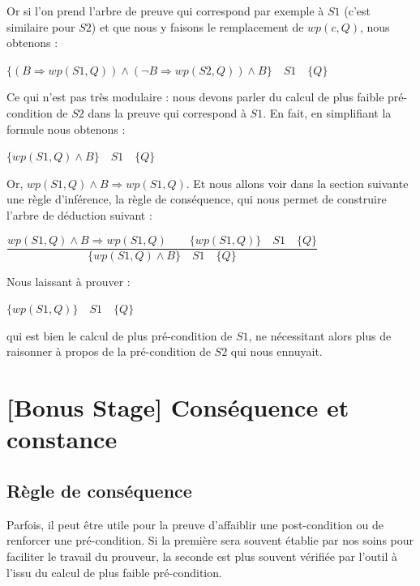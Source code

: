 \documentclass[12pt,francais,]{scrbook}
\begin{document}
Or si l'on prend l'arbre de preuve qui correspond par exemple à \(S1\)
(c'est similaire pour \(S2\)) et que nous y faisons le remplacement de
\(wp(c,Q)\), nous obtenons :

\begin{center}
\(\{ (B \Rightarrow wp(S1,Q)) \wedge (\neg B \Rightarrow wp(S2,Q)) \wedge B \} \quad S1 \quad \{Q\}\)
\end{center}

Ce qui n'est pas très modulaire : nous devons parler du calcul de plus
faible pré-condition de \(S2\) dans la preuve qui correspond à \(S1\).
En fait, en simplifiant la formule nous obtenons :

\begin{center} \(\{ wp(S1,Q) \wedge B \} \quad S1 \quad \{Q\}\)
\end{center}

Or, \(wp(S1,Q) \wedge B \Rightarrow wp(S1,Q)\). Et nous allons voir dans
la section suivante une règle d'inférence, la règle de conséquence, qui
nous permet de construire l'arbre de déduction suivant :

\begin{center}
\(\dfrac{wp(S1,Q) \wedge B \Rightarrow wp(S1,Q)\quad\quad\{ wp(S1,Q) \} \quad S1 \quad \{Q\}}{\{ wp(S1,Q) \wedge B \} \quad S1 \quad \{Q\}}\)
\end{center}

Nous laissant à prouver :

\begin{center} \(\{ wp(S1,Q) \} \quad S1 \quad \{Q\}\) \end{center}

qui est bien le calcul de plus pré-condition de \(S1\), ne nécessitant
alors plus de raisonner à propos de la pré-condition de \(S2\) qui nous
ennuyait.

\section{{[}Bonus Stage{]} Conséquence et
constance}\label{bonus-stage-consuxe9quence-et-constance}

\subsection{Règle de conséquence}\label{ruxe8gle-de-consuxe9quence}

Parfois, il peut être utile pour la preuve d'affaiblir une
post-condition ou de renforcer une pré-condition. Si la première sera
souvent établie par nos soins pour faciliter le travail du prouveur, la
seconde est plus souvent vérifiée par l'outil à l'issu du calcul de plus
faible pré-condition.
\end{document}
